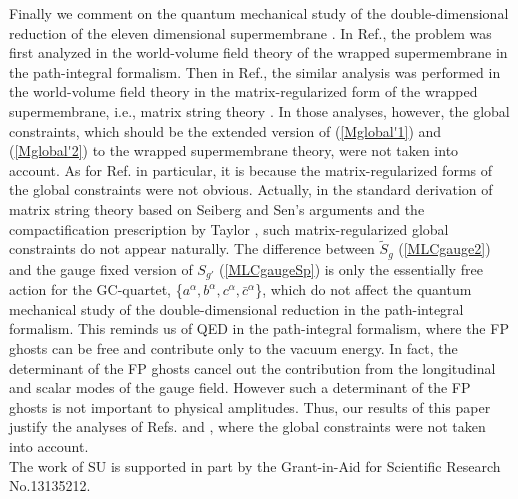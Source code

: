 \documentclass[12pt,a4paper]{article}
\begin{document}
Finally we comment on the quantum mechanical study of the
double-dimensional reduction of the eleven dimensional supermembrane
\cite{SY,UY}.
In Ref.\cite{SY}, the problem was first analyzed in the world-volume
field theory of the wrapped supermembrane in the path-integral formalism.
Then in Ref.\cite{UY}, the similar analysis was performed in the
world-volume field theory in the matrix-regularized form of the
wrapped supermembrane, i.e., matrix string theory \cite{Mot,DVV}.
In those analyses, however, the global constraints, which should
be the extended version of (\ref{Mglobal'1}) and (\ref{Mglobal'2})
to the wrapped supermembrane theory, were not taken into account.
As for Ref.\cite{UY} in particular, it is because the
matrix-regularized forms of the global constraints were not obvious.
Actually, in the standard derivation \cite{Mot,DVV} of matrix string
theory based on Seiberg and Sen's arguments \cite{Sei,Sen} and the
compactification prescription by Taylor \cite{Tay}, such
matrix-regularized global constraints do not appear naturally.
The difference between $\tilde{S}_g$ (\ref{MLCgauge2}) and the gauge
fixed version of $S_{g'}$ (\ref{MLCgaugeSp}) is only the essentially
free action for the GC-quartet, \{$a^\alpha, b^\alpha, c^{\alpha},
\bar{c}^{\alpha}$\}, which do not affect the quantum mechanical study of
the double-dimensional reduction in the path-integral formalism.
This reminds us of QED in the path-integral formalism, where
the FP ghosts can be free and contribute only to the vacuum energy.
In fact, the determinant of the FP ghosts cancel out the contribution
from the longitudinal and scalar modes of the gauge field.
However such a determinant of the FP ghosts is not important to
physical amplitudes.
Thus, our results of this paper justify the analyses of Refs.\cite{SY}
and \cite{UY}, where the global constraints were not taken into
account.\\[\baselineskip]
The work of SU is supported in part by the Grant-in-Aid for Scientific
Research No.13135212.
\end{document}
